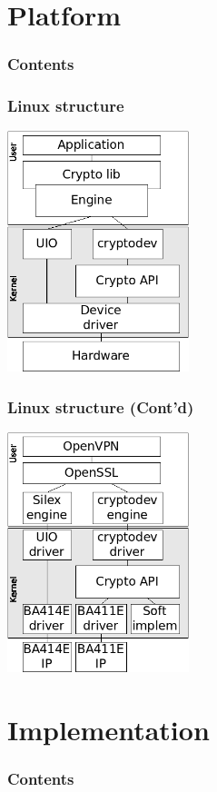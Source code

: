 \documentclass[xcolor={x11names, rgb, usenames, dvipsnames}]{beamer}
\begin{document}
\section{Platform}
\begin{frame}
\frametitle{Contents}
\tableofcontents[%
	currentsection,
	sectionstyle=show/shaded,
	subsectionstyle=show/show/hide,
	]
\end{frame}

\begin{frame}
\frametitle{Linux structure}
	\begin{center}
	\includegraphics[height=7cm]{os-path-generic.png}
	\end{center}
\end{frame}


\begin{frame}
\frametitle{Linux structure (Cont'd)}
	\begin{center}
	\includegraphics[height=7cm]{os-path-specific.png}
	\end{center}
\end{frame}





\section{Implementation}
\begin{frame}
\frametitle{Contents}
\tableofcontents[%
	currentsection,
	sectionstyle=show/shaded,
	subsectionstyle=show/show/hide,
	]
\end{frame}
\end{document}
